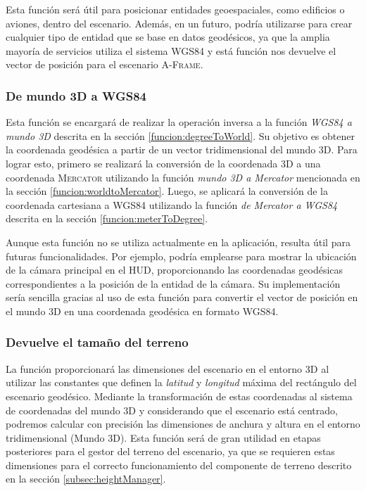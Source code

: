 \documentclass[a4paper, 11pt]{book}
\begin{document}
Esta función será útil para posicionar entidades geoespaciales, como edificios o aviones, dentro del escenario. Además, en un futuro, podría utilizarse para crear cualquier tipo de entidad que se base en datos geodésicos, ya que la amplia mayoría de servicios utiliza el sistema \textsc{WGS84} y está función nos devuelve el vector de posición para el escenario \textsc{A-Frame}.

\subsubsection{De mundo 3D a WGS84}
\label{funcion:worldToDegree}
Esta función se encargará de realizar la operación inversa a la función \emph{WGS84 a mundo 3D} descrita en la sección \ref{funcion:degreeToWorld}. Su objetivo es obtener la coordenada geodésica a partir de un vector tridimensional del mundo 3D. Para lograr esto, primero se realizará la conversión de la coordenada \textsc{3D} a una coordenada \textsc{Mercator} utilizando la función \emph{mundo 3D a Mercator} mencionada en la sección \ref{funcion:worldtoMercator}. Luego, se aplicará la conversión de la coordenada cartesiana a \textsc{WGS84} utilizando la función \emph{de Mercator a WGS84} descrita en la sección \ref{funcion:meterToDegree}.

Aunque esta función no se utiliza actualmente en la aplicación, resulta útil para futuras funcionalidades. Por ejemplo, podría emplearse para mostrar la ubicación de la cámara principal en el \textsc{\gls{HUD}}, proporcionando las coordenadas geodésicas correspondientes a la posición de la entidad de la cámara. Su implementación sería sencilla gracias al uso de esta función para convertir el vector de posición en el mundo 3D en una coordenada geodésica en formato \textsc{WGS84}.

\subsubsection{Devuelve el tamaño del terreno}
\label{funcion:getGroundSize}
La función proporcionará las dimensiones del escenario en el entorno \textsc{3D} al utilizar las constantes que definen la \emph{latitud} y \emph{longitud} máxima del rectángulo del escenario geodésico. Mediante la transformación de estas coordenadas al sistema de coordenadas del mundo \textsc{3D} y considerando que el escenario está centrado, podremos calcular con precisión las dimensiones de anchura y altura en el entorno tridimensional (Mundo 3D). Esta función será de gran utilidad en etapas posteriores para el gestor del terreno del escenario, ya que se requieren estas dimensiones para el correcto funcionamiento del componente de terreno descrito en la sección \ref{subsec:heightManager}.
\end{document}
